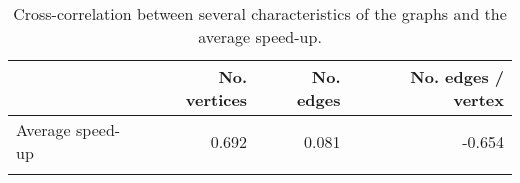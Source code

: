 \begin{table}[h]
\centering
 \caption{Cross-correlation between several characteristics of the graphs and the average speed-up.}
\begin{tabular}{lrrr}
\toprule
{} &  No. vertices &   No. edges &        No. edges / vertex \\
\midrule
Average speed-up             &    0.692 &  0.081 &         -0.654 \\
\bottomrule
\label{tab:mst corr}
\end{tabular}
\end{table}